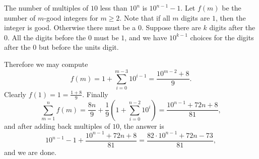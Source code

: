 The number of multiples of $10$ less than $10^n$ is $10^{n-1}-1$. Let $f(m)$ be the number of $m$-good integers for $m\ge2$. Note that if all $m$ digits are $1$, then the integer is good. Otherwise there must be a $0$. Suppose there are $k$ digits after the $0$. All the digits before the $0$ must be $1$, and we have $10^{k-1}$ choices for the digits after the $0$ but before the units digit.

Therefore we may compute \[f(m)=1+\sum_{i=0}^{m-3}10^{i-1}=\frac{10^{m-2}+8}9.\]
Clearly $f(1)=1=\frac{1+8}9$. Finally \[\sum_{m=1}^nf(m)=\frac{8n}9+\frac19\left(1+\sum_{i=0}^{n-2}10^i\right)=\frac{10^{n-1}+72n+8}{81},\]
and after adding back multiples of $10$, the answer is \[10^{n-1}-1+\frac{10^{n-1}+72n+8}{81}=\boxed{\frac{82\cdot10^{n-1}+72n-73}{81}},\]
and we are done.


